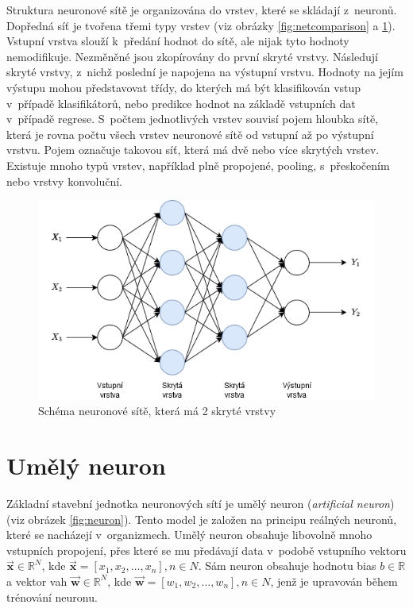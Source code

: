 Struktura neuronové sítě je organizována do vrstev, které se skládají z~neuronů. Dopředná síť je tvořena třemi typy vrstev (viz obrázky \ref{fig:netcomparison} a \ref{fig:mlp}). Vstupní vrstva slouží k~předání hodnot do sítě, ale nijak tyto hodnoty nemodifikuje. Nezměněné jsou zkopírovány do první skryté vrstvy. Následují skryté vrstvy, z~nichž poslední je napojena na výstupní vrstvu. Hodnoty na jejím výstupu mohou představovat třídy, do kterých má být klasifikován vstup v~případě klasifikátorů, nebo predikce hodnot na základě vstupních dat v~případě regrese. S~počtem jednotlivých vrstev souvisí pojem hloubka sítě, která je rovna počtu všech vrstev neuronové sítě od vstupní až po výstupní vrstvu. Pojem  označuje takovou síť, která má dvě nebo více skrytých vrstev. Existuje mnoho typů vrstev, například plně propojené, pooling, s~přeskočením nebo vrstvy konvoluční.

\begin{figure}[H]
    \centering
    \includegraphics[scale=0.75]{obrazky-figures/mlp.png}
    \caption{\label{fig:mlp}Schéma neuronové sítě, která má 2 skryté vrstvy}
\end{figure}


\section{Umělý neuron}
Základní stavební jednotka neuronových sítí je umělý neuron (\textit{artificial neuron}) (viz obrázek \ref{fig:neuron}). Tento model je založen na principu reálných neuronů, které se nacházejí v~organizmech. Umělý neuron obsahuje libovolně mnoho vstupních propojení, přes které se mu předávají data v~podobě vstupního vektoru $\boldsymbol{\overrightarrow{x}} \in \mathbb{R}^N$, kde $\boldsymbol{\overrightarrow{x}} = [x_1, x_2, \dots, x_n], n \in N$. Sám neuron obsahuje hodnotu bias $b \in \mathbb{R}$ a vektor vah $\boldsymbol{\overrightarrow{w}} \in \mathbb{R}^N$, kde $\boldsymbol{\overrightarrow{w}} = [w_1, w_2, \dots, w_n], n \in N$, jenž je upravován během trénování neuronu.


